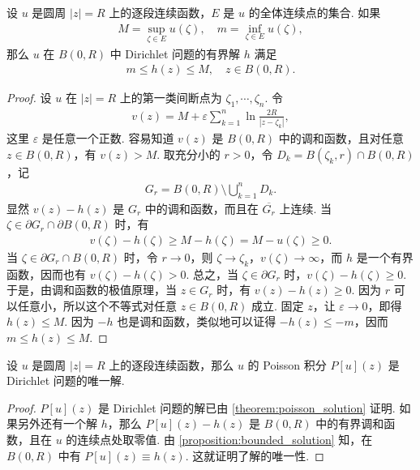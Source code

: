 \documentclass[../../main.tex]{subfiles}%
\begin{document}
\begin{proposition}\label{proposition:bounded_solution}
设 \(u\) 是圆周 \(|z|=R\) 上的逐段连续函数，\(E\) 是 \(u\) 的全体连续点的集合. 如果
\begin{align*}
M = \sup\limits_{\zeta\in E} u(\zeta), \quad m = \inf\limits_{\zeta\in E} u(\zeta),
\end{align*}
那么 \(u\) 在 \(B(0,R)\) 中 Dirichlet 问题的有界解 \(h\) 满足
\begin{align*}
m \leqslant h(z) \leqslant M, \quad z\in B(0,R).
\end{align*}
\end{proposition}
\begin{proof}
设 \(u\) 在 \(|z|=R\) 上的第一类间断点为 \(\zeta_1, \cdots, \zeta_n\). 令
\begin{align*}
v(z) = M + \varepsilon \sum\limits_{k=1}^{n} \ln \frac{2R}{|z-\zeta_k|},
\end{align*}
这里 \(\varepsilon\) 是任意一个正数. 容易知道 \(v(z)\) 是 \(B(0,R)\) 中的调和函数，且对任意 \(z\in B(0,R)\)，有 \(v(z)>M\). 取充分小的 \(r>0\)，令 \(D_k = B(\zeta_k,r)\cap B(0,R)\)，记
\begin{align*}
G_r = B(0,R) \setminus \bigcup\limits_{k=1}^{n} D_k.
\end{align*}
显然 \(v(z)-h(z)\) 是 \(G_r\) 中的调和函数，而且在 \(\overline{G_r}\) 上连续. 当 \(\zeta\in \partial G_r \cap \partial B(0,R)\) 时，有
\begin{align*}
v(\zeta) - h(\zeta) \geqslant M - h(\zeta) = M - u(\zeta) \geqslant 0.
\end{align*}
当 \(\zeta\in \partial G_r \cap B(0,R)\) 时，令 \(r\to 0\)，则 \(\zeta\to \zeta_k\)，\(v(\zeta)\to \infty\)，而 \(h\) 是一个有界函数，因而也有 \(v(\zeta)-h(\zeta)>0\). 总之，当 \(\zeta\in \partial G_r\) 时，\(v(\zeta)-h(\zeta)\geqslant 0\). 于是，由调和函数的极值原理，当 \(z\in G_r\) 时，有 \(v(z)-h(z)\geqslant 0\). 因为 \(r\) 可以任意小，所以这个不等式对任意 \(z\in B(0,R)\) 成立. 固定 \(z\)，让 \(\varepsilon\to 0\)，即得 \(h(z)\leqslant M\). 因为 \(-h\) 也是调和函数，类似地可以证得 \(-h(z)\leqslant -m\)，因而 \(m\leqslant h(z)\leqslant M\).
\end{proof}

\begin{theorem}
设 \(u\) 是圆周 \(|z|=R\) 上的逐段连续函数，那么 \(u\) 的 Poisson 积分 \(P[u](z)\) 是 Dirichlet 问题的唯一解.
\end{theorem}
\begin{proof}
\(P[u](z)\) 是 Dirichlet 问题的解已由 \cref{theorem:poisson_solution} 证明. 如果另外还有一个解 \(h\)，那么 \(P[u](z)-h(z)\) 是 \(B(0,R)\) 中的有界调和函数，且在 \(u\) 的连续点处取零值. 由 \cref{proposition:bounded_solution} 知，在 \(B(0,R)\) 中有 \(P[u](z)\equiv h(z)\). 这就证明了解的唯一性.
\end{proof}
\end{document}
